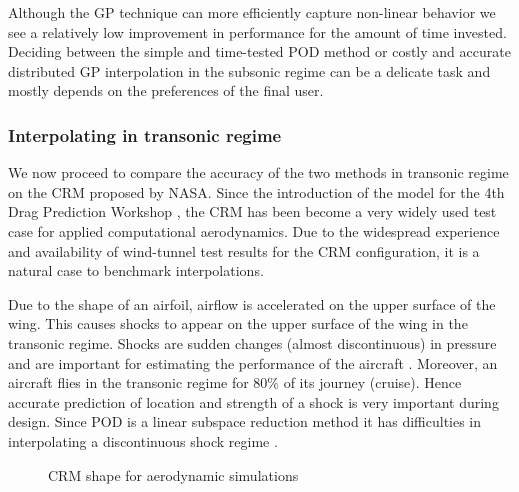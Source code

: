 Although the GP technique can more efficiently capture non-linear behavior we see a relatively low improvement in performance for the amount of time invested. Deciding between the simple and time-tested POD method or costly and accurate distributed GP interpolation in the subsonic regime can be a delicate task and mostly depends on the preferences of the final user.

\subsubsection{Interpolating in transonic regime}\label{subSec:resultsCRM}
We now proceed to compare the accuracy of the two methods in transonic regime on the CRM proposed by NASA. Since the introduction of the model for the 4th Drag Prediction Workshop \cite{vassberg2014summary}, the CRM has been become a very widely used test case for applied computational aerodynamics. Due to the widespread experience and availability of wind-tunnel test results for the CRM configuration, it is a natural case to benchmark interpolations. 

Due to the shape of an airfoil, airflow is accelerated on the upper surface of the wing. This causes shocks to appear on the upper surface of the wing in the transonic regime. Shocks are sudden changes (almost discontinuous) in pressure and are important for estimating the performance of the aircraft \cite{jameson1974iterative, cole2012transonic}. Moreover, an aircraft flies in the transonic regime for 80\% of its journey (cruise). Hence accurate prediction of location and strength of a shock is very important during design. Since POD is a linear subspace reduction method it has difficulties in interpolating a discontinuous shock regime \cite{verveld2016reduced}.

\begin{figure}[!ht]
  \centering
  \quad
  \caption{CRM shape for aerodynamic simulations}
\end{figure}

